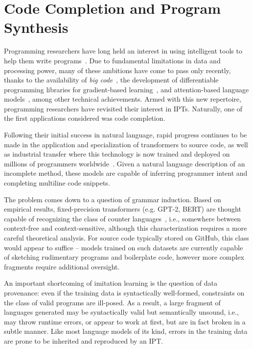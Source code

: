 \documentclass[12pt]{article}
\begin{document}
\pagebreak\section{Code Completion and Program Synthesis}\label{sec:autocompletion}

Programming researchers have long held an interest in using intelligent tools to help them write programs~\cite{bras1993artificial}. Due to fundamental limitations in data and processing power, many of these ambitions have come to pass only recently, thanks to the availability of \textit{big code}~\cite{allamanis2018survey}, the development of differentiable programming libraries for gradient-based learning~\cite{baydin2018automatic}, and attention-based language models~\cite{vaswani2017attention}, among other technical achievements. Armed with this new repertoire, programming researchers have revisited their interest in IPTs. Naturally, one of the first applications considered was code completion.

Following their initial success in natural language, rapid progress continues to be made in the application and specialization of transformers to source code, as well as industrial transfer where this technology is now trained and deployed on millions of programmers worldwide~\cite{chen2021evaluating}. Given a natural language description of an incomplete method, these models are capable of inferring programmer intent and completing multiline code snippets.

The problem comes down to a question of grammar induction. Based on empirical results, fixed-precision transformers (e.g. GPT-2, BERT) are thought capable of recognizing the class of counter languages~\cite{bhattamishra2020ability}, i.e., somewhere between context-free and context-sensitive, although this characterization requires a more careful theoretical analysis. For source code typically stored on GitHub, this class would appear to suffice -- models trained on such datasets are currently capable of sketching rudimentary programs and boilerplate code, however more complex fragments require additional oversight.

An important shortcoming of imitation learning is the question of data provenance: even if the training data is syntactically well-formed, constraints on the class of valid programs are ill-posed. As a result, a large fragment of languages generated may be syntactically valid but semantically unsound, i.e., may throw runtime errors, or appear to work at first, but are in fact broken in a subtle manner. Like most language models of its kind, errors in the training data are prone to be inherited and reproduced by an IPT.
\end{document}
